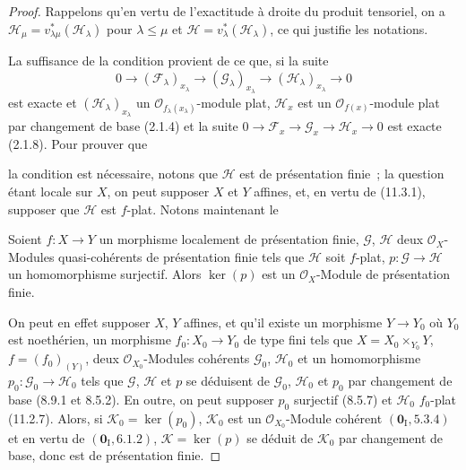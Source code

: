 \begin{proof}
Rappelons qu'en vertu de l'exactitude à droite du produit tensoriel, on a
$\mathcal H_\mu=v_{\lambda\mu}^*(\mathcal H_\lambda)$ pour $\lambda\leq\mu$ et
$\mathcal H=v_\lambda^*(\mathcal H_\lambda)$, ce qui justifie les notations.

La suffisance de la condition provient de ce que, si la suite
\[
0\longrightarrow(\mathcal F_\lambda)_{x_\lambda}
\longrightarrow(\mathcal G_\lambda)_{x_\lambda}
\longrightarrow(\mathcal H_\lambda)_{x_\lambda}\longrightarrow0
\]
est exacte et $(\mathcal H_\lambda)_{x_\lambda}$ un
$\mathcal O_{f_\lambda(x_\lambda)}$-module plat, $\mathcal H_x$ est un
$\mathcal O_{f(x)}$-module plat par changement de base (2.1.4) et la suite
$0\to\mathcal F_x\to\mathcal G_x\to\mathcal H_x\to0$ est exacte (2.1.8).
Pour prouver que


la condition est nécessaire, notons que $\mathcal H$ est de présentation
finie~; la question étant locale sur $X$, on peut supposer $X$ et $Y$ affines,
et, en vertu de (11.3.1), supposer que $\mathcal H$ est $f$-plat. Notons
maintenant le

\begin{lemma}[11.3.9.1]
\label{IV.11.3.9.1-fr}
Soient $f:X\to Y$ un morphisme localement de présentation finie,
$\mathcal G$, $\mathcal H$ deux $\mathcal O_X$-Modules quasi-cohérents de
présentation finie tels que $\mathcal H$ soit $f$-plat,
$p:\mathcal G\to\mathcal H$ un homomorphisme surjectif. Alors $\ker(p)$ est un
$\mathcal O_X$-Module de présentation finie.
\end{lemma}

On peut en effet supposer $X$, $Y$ affines, et qu'il existe un morphisme
$Y\to Y_0$ où $Y_0$ est noethérien, un morphisme $f_0:X_0\to Y_0$ de type fini
tels que $X=X_0\times_{Y_0}Y$, $f=(f_0)_{(Y)}$, deux
$\mathcal O_{X_0}$-Modules cohérents $\mathcal G_0$, $\mathcal H_0$ et un
homomorphisme $p_0:\mathcal G_0\to\mathcal H_0$ tels que $\mathcal G$,
$\mathcal H$ et $p$ se déduisent de $\mathcal G_0$, $\mathcal H_0$ et $p_0$ par
changement de base (8.9.1 et 8.5.2). En outre, on peut supposer $p_0$ surjectif
(8.5.7) et $\mathcal H_0$ $f_0$-plat (11.2.7). Alors, si
$\mathcal K_0=\ker(p_0)$, $\mathcal K_0$ est un
$\mathcal O_{X_0}$-Module cohérent $(\mathbf 0_{\mathrm I},5.3.4)$ et en vertu
de $(\mathbf 0_{\mathrm I},6.1.2)$, $\mathcal K=\ker(p)$ se déduit de
$\mathcal K_0$ par changement de base, donc est de présentation finie.


\end{proof}
